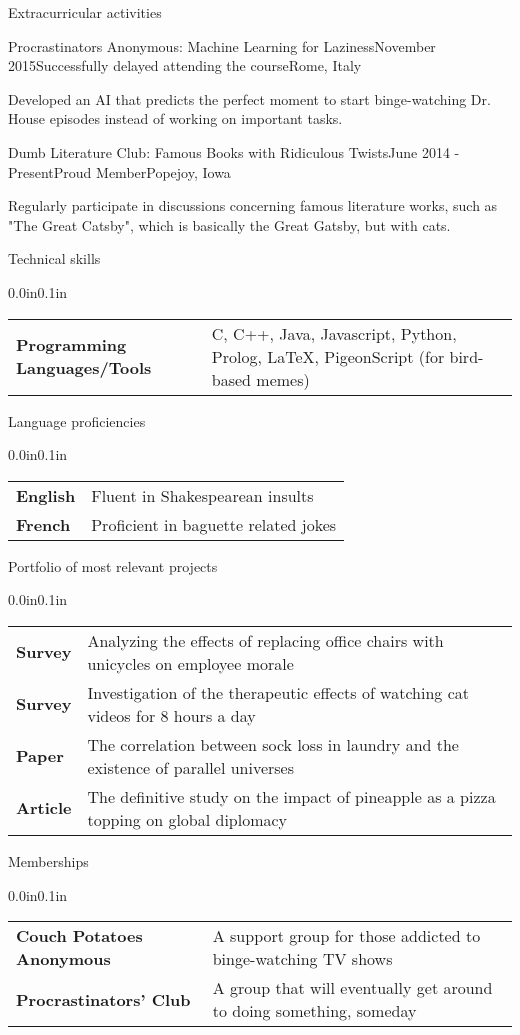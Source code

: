 \documentclass{resume} %
\makeatletter
\newcommand{\plainitem}[1]{\item{#1}}
\newcommand{\entry}[2]{#1 & #2 \tabularnewline} %
\newcommand{\tableEnv}[2]{%
  \begin{rSection}{#1} %
    \begin{adjustwidth}{0.0in}{0.1in} %
      \begin{tabularx}{\linewidth}{@{} >{\bfseries}l @{\hspace{6ex}} X @{}}
        #2 %
      \end{tabularx}
    \end{adjustwidth}
  \end{rSection}
}
\makeatother
\begin{document}
\begin{rSection}{Extracurricular activities}

\begin{rSubsectionNoBullet}{Procrastinators Anonymous: Machine Learning for Laziness}{November 2015}{Successfully delayed attending the course}{Rome, Italy}
    \plainitem{Developed an AI that predicts the perfect moment to start binge-watching Dr. House episodes instead of working on important tasks.}
\end{rSubsectionNoBullet}

\begin{rSubsectionNoBullet}{Dumb Literature Club: Famous Books with Ridiculous Twists}{June 2014 - Present}{Proud Member}{Popejoy, Iowa}
    \plainitem{Regularly participate in discussions concerning famous literature works, such as "The Great Catsby", which is basically the Great Gatsby, but with cats.}
\end{rSubsectionNoBullet}

\end{rSection}


\tableEnv{Technical skills}{
    \entry{Programming Languages/Tools}{C, C++, Java, Javascript, Python, Prolog, \LaTeX, PigeonScript (for bird-based memes)}
}


\tableEnv{Language proficiencies}{
    \entry{English}{Fluent in Shakespearean insults}
    \entry{French}{Proficient in baguette related jokes}
}


\tableEnv{Portfolio of most relevant projects}{
    \entry{Survey}{Analyzing the effects of replacing office chairs with unicycles on employee morale}
    \entry{Survey}{Investigation of the therapeutic effects of watching cat videos for 8 hours a day}
    \entry{Paper}{The correlation between sock loss in laundry and the existence of parallel universes}
    \entry{Article}{The definitive study on the impact of pineapple as a pizza topping on global diplomacy}
}


\tableEnv{Memberships}{
    \entry{Couch Potatoes Anonymous}{A support group for those addicted to binge-watching TV shows}
    \entry{Procrastinators' Club}{A group that will eventually get around to doing something, someday}
}
\end{document}
